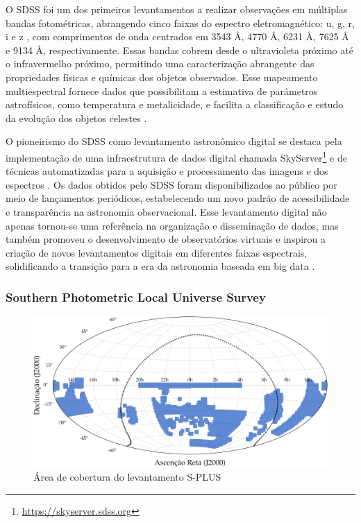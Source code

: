 O SDSS foi um dos primeiros levantamentos a realizar observações em múltiplas bandas fotométricas, abrangendo cinco faixas do espectro eletromagnético: u, g, r, i e z \cite{sdss-filters}, com comprimentos de onda centrados em 3543 $\si{\angstrom}$, 4770 $\si{\angstrom}$, 6231 $\si{\angstrom}$, 7625 $\si{\angstrom}$ e 9134 $\si{\angstrom}$, respectivamente. Essas bandas cobrem desde o ultravioleta próximo até o infravermelho próximo, permitindo uma caracterização abrangente das propriedades físicas e químicas dos objetos observados. Esse mapeamento multiespectral fornece dados que possibilitam a estimativa de parâmetros astrofísicos, como temperatura e metalicidade, e facilita a classificação e estudo da evolução dos objetos celestes \cite{sdss-photo}.

O pioneirismo do SDSS como levantamento astronômico digital se destaca pela implementação de uma infraestrutura de dados digital chamada SkyServer\footnote{\url{https://skyserver.sdss.org}} \cite{skyserver} e de técnicas automatizadas para a aquisição e processamento das imagens \cite{sdss-photo} e dos espectros \cite{sdss-spec}. Os dados obtidos pelo SDSS foram disponibilizados ao público por meio de lançamentos periódicos, estabelecendo um novo padrão de acessibilidade e transparência na astronomia observacional. Esse levantamento digital não apenas tornou-se uma referência na organização e disseminação de dados, mas também promoveu o desenvolvimento de observatórios virtuais e inspirou a criação de novos levantamentos digitais em diferentes faixas espectrais, solidificando a transição para a era da astronomia baseada em big data \cite{sciserver}.





\subsubsection{Southern Photometric Local Universe Survey}
\label{sec:splus}

\begin{figure}[!ht]
  \caption{Área de cobertura do levantamento S-PLUS}
  \label{fig:coverage-splus}
  \includegraphics[width=\linewidth]{notebooks/plots/splus_footprint.pdf}
\end{figure}

